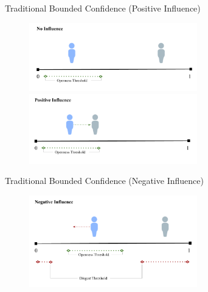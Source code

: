 \documentclass[12pt]{beamer}
\begin{document}
\begin{frame}[c]{\normalsize Traditional Bounded Confidence (Positive Influence)}  %



\begin{figure}
	\includegraphics[width=0.65\textwidth]{images/BCNoInfluence.png}
	\hfill
	\includegraphics[width=0.65\textwidth]{images/BCPositiveInfluence.png}
\end{figure}


\end{frame}

\begin{frame}[c]{\normalsize Traditional Bounded Confidence (Negative Influence)}  %


\begin{figure}
	\includegraphics[width=0.65\textwidth]{images/BCNegativeInfluence.png}
\end{figure}


\end{frame}
\end{document}
